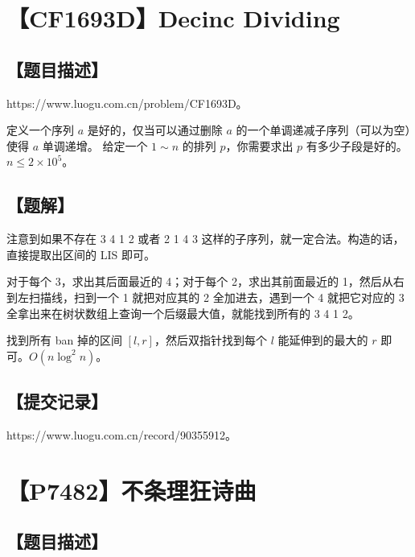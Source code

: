 \documentclass[UTF8,12pt,a4paper]{ctexart}
\begin{document}
	\section*{【CF1693D】Decinc Dividing}
	
	\subsection*{【题目描述】}
	
	https://www.luogu.com.cn/problem/CF1693D。
	
	定义一个序列 $a$ 是好的，仅当可以通过删除 $a$ 的一个单调递减子序列（可以为空）使得 $a$ 单调递增。  
	给定一个 $1\sim n$ 的排列 $p$，你需要求出 $p$ 有多少子段是好的。$n\le 2\times 10^5$。
	
	\subsection*{【题解】}
	
	注意到如果不存在 3 4 1 2 或者 2 1 4 3 这样的子序列，就一定合法。构造的话，直接提取出区间的 LIS 即可。
	
	对于每个 3，求出其后面最近的 4；对于每个 2，求出其前面最近的 1，然后从右到左扫描线，扫到一个 1 就把对应其的 2 全加进去，遇到一个 4 就把它对应的 3 全拿出来在树状数组上查询一个后缀最大值，就能找到所有的 3 4 1 2。
	
	找到所有 ban 掉的区间 $[l,r]$，然后双指针找到每个 $l$ 能延伸到的最大的 $r$ 即可。$O(n\log^2n)$。
	
	\subsection*{【提交记录】}
	
	https://www.luogu.com.cn/record/90355912。
	
	
	\section*{【P7482】不条理狂诗曲}
	
	\subsection*{【题目描述】}
	
\end{document}
